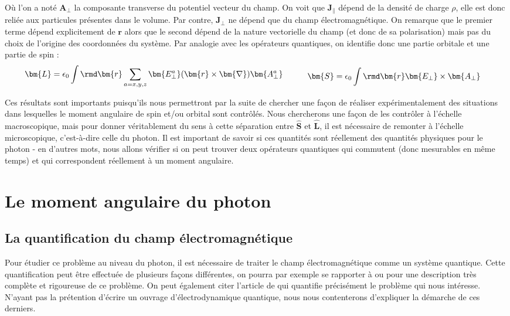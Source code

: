 Où l'on a noté $\bm{A}_{\bot}$ la composante transverse du potentiel vecteur du champ. On voit que $\bm{J_{\parallel}}$ dépend de la densité de charge $\rho$, elle est donc reliée aux particules présentes dans le volume. Par contre, $\bm{J_{\bot}}$ ne dépend que du champ électromagnétique. On remarque que le premier terme dépend explicitement de $\bm{r}$ alors que le second dépend de la nature vectorielle du champ (et donc de sa polarisation) mais pas du choix de l'origine des coordonnées du système. Par analogie avec les opérateurs quantiques, on identifie donc une partie orbitale et une partie de spin :
\begin{equation}
\begin{aligned}[c]
\bm{L}&=\epsilon_0\int{\rmd\bm{r}\sum_{a=x,y,z} \bm{E^a_{\bot}}(\bm{r}\times\bm{\nabla})\bm{A^a_{\bot}}}
\end{aligned}
\qquad
\begin{aligned}[c]
\bm{S}&=\epsilon_0\int{\rmd\bm{r}\bm{E_{\bot}}\times\bm{A_{\bot}}}
\end{aligned}
\label{SeparationJS_classique}
\end{equation} 
 
Ces résultats sont importants puisqu'ils nous permettront par la suite de chercher une façon de réaliser expérimentalement des situations dans lesquelles le moment angulaire de spin et/ou orbital sont contrôlés. Nous chercherons une façon de les contrôler à l'échelle macroscopique, mais pour donner véritablement du sens à cette séparation entre $\bm{\hat{S}}$ et $\bm{\hat{L}}$, il est nécessaire de remonter à l'échelle microscopique, c'est-à-dire celle du photon. Il est important de savoir si ces quantités sont réellement des quantités physiques pour le photon - en d'autres mots, nous allons vérifier si on peut trouver deux opérateurs quantiques qui commutent (donc mesurables en même temps) et qui correspondent réellement à un moment angulaire.



\section{Le moment angulaire du photon}
\subsection{La quantification du champ électromagnétique}
\label{sec:quant_EM}
Pour étudier ce problème au niveau du photon, il est nécessaire de traiter le champ électromagnétique comme un système quantique. Cette quantification peut être effectuée de plusieurs façons différentes, on pourra par exemple se rapporter à  ou  pour une description très complète et rigoureuse de ce problème. On peut également citer l'article de  qui quantifie précisément le problème qui nous intéresse. N'ayant pas la prétention d'écrire un ouvrage d'électrodynamique quantique, nous nous contenterons d'expliquer la démarche de ces derniers.

